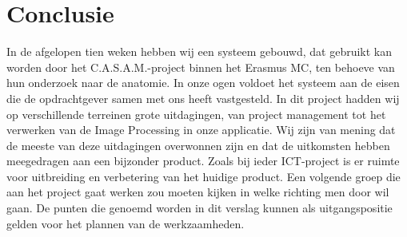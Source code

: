 \section{Conclusie}
\label{Conclusie}
In de afgelopen tien weken hebben wij een systeem gebouwd, dat gebruikt kan worden door het C.A.S.A.M.-project binnen het Erasmus MC, ten behoeve van hun onderzoek naar de anatomie.
In onze ogen voldoet het systeem aan de eisen die de opdrachtgever samen met ons heeft vastgesteld. 
In dit project hadden wij op verschillende terreinen grote uitdagingen,
van project management tot het verwerken van de Image Processing in onze applicatie.
Wij zijn van mening dat de meeste van deze uitdagingen overwonnen zijn en dat de uitkomsten hebben meegedragen aan een bijzonder product. 
Zoals bij ieder ICT-project is er ruimte voor uitbreiding en verbetering van het huidige product.
Een volgende groep die aan het project gaat werken zou moeten kijken in welke richting men door wil gaan.
De punten die genoemd worden in dit verslag kunnen als uitgangspositie gelden voor het plannen van de werkzaamheden.
